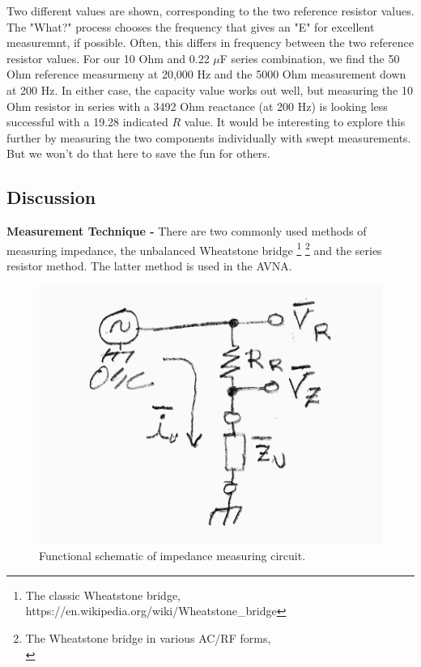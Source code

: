 %
Two different values are shown, corresponding to the two reference resistor values.  The "What?" process chooses the frequency that gives an "E" for excellent measuremnt, if possible.  Often, this differs in frequency between the two reference resistor values.  For our 10 Ohm and 0.22 $\mu$F series combination, we find the 50 Ohm reference measurmeny at 20,000 Hz and the 5000 Ohm measurement down at 200 Hz.  In either case, the capacity value works out well, but measuring the 10 Ohm resistor in series with a 3492 Ohm reactance (at 200 Hz) is looking less successful with a 19.28 indicated \(R\) value.  It would be interesting to explore this further by measuring the two components individually with swept measurements.  But we won't do that here to save the fun for others.
%
\subsection{Discussion}
%
\textbf{Measurement Technique - } There are two commonly used methods of measuring impedance, the unbalanced Wheatstone bridge
%
\footnote{The classic Wheatstone bridge, https://en.wikipedia.org/wiki/Wheatstone\_bridge}
\footnote{The Wheatstone bridge in various AC/RF forms,\\ \hspace*{1.0 in}{http://g3ynh.info/zdocs/bridges/part\_1.html}}
%
 and the series resistor method.   The latter method is used in the AVNA.
\begin{figure}[H]
\begin{center}
\includegraphics[scale=0.75]{./images/AVNA_900.pdf}
\caption{Functional schematic of impedance measuring circuit.} 
\label{AVNA_900-label}
\end{center}
\end{figure}
